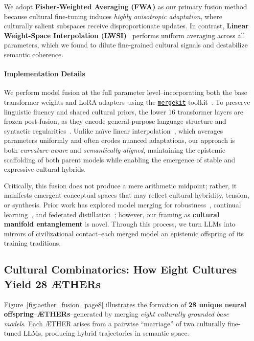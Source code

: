 We adopt \textbf{Fisher-Weighted Averaging (FWA)} as our primary fusion method because cultural fine-tuning induces \textit{highly anisotropic adaptation}, where culturally salient subspaces receive disproportionate updates. In contrast, \textbf{Linear Weight-Space Interpolation (LWSI)}~\citep{wortsman2022model} performs uniform averaging across all parameters, which we found to dilute fine-grained cultural signals and destabilize semantic coherence.

\paragraph{Implementation Details}

We perform model fusion at the full parameter level--incorporating both the base transformer weights and LoRA adapters--using the \href{https://github.com/arcee-ai/mergekit}{\texttt{mergekit}} toolkit~\citep{mergekit2023}. To preserve linguistic fluency and shared cultural priors, the lower 16 transformer layers are frozen post-fusion, as they encode general-purpose language structure and syntactic regularities~\citep{li2022branch}. Unlike naïve linear interpolation~\citep{wortsman2022model}, which averages parameters uniformly and often erodes nuanced adaptations, our approach is both \textit{curvature-aware} and \textit{semantically aligned}, maintaining the epistemic scaffolding of both parent models while enabling the emergence of stable and expressive cultural hybrids.

Critically, this fusion does not produce a mere arithmetic midpoint; rather, it manifests emergent conceptual spaces that may reflect cultural hybridity, tension, or synthesis. Prior work has explored model merging for robustness~\citep{rame2023merging}, continual learning~\citep{ainslie2023merged}, and federated distillation~\citep{ilharco2023editing}; however, our framing as \textbf{cultural manifold entanglement} is novel. Through this process, we turn LLMs into mirrors of civilizational contact--each merged model an epistemic offspring of its training traditions.


\subsection{Cultural Combinatorics: How Eight Cultures Yield 28 ÆTHERs}

Figure~\ref{fig:aether_fusion_page8} illustrates the formation of \textbf{28 unique neural offspring}--\textbf{ÆTHERs}--generated by merging \emph{eight culturally grounded base models}. Each ÆTHER arises from a pairwise ``marriage'' of two culturally fine-tuned LLMs, producing hybrid trajectories in semantic space.

